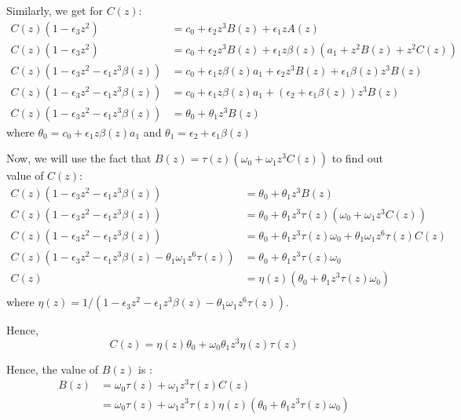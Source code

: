 \documentclass[11pt,a4paper]{article}
\begin{document}
Similarly, we get for $C(z)$:
\begin{align*}
C(z)(1 - \epsilon_3 z^2 ) & =  c_0 +   \epsilon_2 z^3 B(z) + \epsilon_1  z A(z)\\
C(z)(1 - \epsilon_3 z^2 )  &=  c_0 +   \epsilon_2 z^3 B(z) + \epsilon_1  z \beta(z) (a_1  +  z^2 B(z) + z^2 C(z))\\
C(z)(1 - \epsilon_3 z^2 - \epsilon_1  z^3   \beta(z))  &=  c_0 +  \epsilon_1  z \beta(z) a_1+  \epsilon_2 z^3 B(z) + \epsilon_1   \beta(z) z^3 B(z) \\
C(z)(1 - \epsilon_3 z^2 - \epsilon_1  z^3   \beta(z))  &=  c_0 +  \epsilon_1  z \beta(z) a_1+  (\epsilon_2 + \epsilon_1   \beta(z)) z^3 B(z)\\
C(z)(1 - \epsilon_3 z^2 - \epsilon_1  z^3   \beta(z))  &=  \theta_0+ \theta_1  z^3 B(z)
\end{align*}
where $\theta_0= c_0 +  \epsilon_1  z \beta(z) a_1$ and $\theta_1= \epsilon_2 + \epsilon_1   \beta(z)$

Now, we will use the fact that $B(z)  =  \tau(z) ( \omega_0+    \omega_1 z^3 C(z) )$ to find out value of $C(z)$:
\begin{align*}
C(z)(1 - \epsilon_3 z^2 - \epsilon_1  z^3   \beta(z))  &=  \theta_0+ \theta_1  z^3 B(z) \\
C(z)(1 - \epsilon_3 z^2 - \epsilon_1  z^3   \beta(z))  &=  \theta_0+ \theta_1  z^3 \tau(z) ( \omega_0+    \omega_1 z^3 C(z) ) \\
C(z)(1 - \epsilon_3 z^2 - \epsilon_1  z^3   \beta(z))  &=  \theta_0+ \theta_1  z^3 \tau(z)  \omega_0 + \theta_1   \omega_1  z^6 \tau(z)    C(z) \\
C(z)(1 - \epsilon_3 z^2 - \epsilon_1  z^3   \beta(z) -\theta_1   \omega_1  z^6 \tau(z)   )  &=  \theta_0+ \theta_1  z^3 \tau(z)  \omega_0  \\
C(z)  &=  \eta(z)( \theta_0+ \theta_1  z^3 \tau(z)  \omega_0 ) \\
\end{align*}
where $\eta(z)=1/(1 - \epsilon_3 z^2 - \epsilon_1  z^3   \beta(z) -\theta_1   \omega_1  z^6 \tau(z)   )$.

Hence, 
\begin{equation}
\boxed{C(z)  =  \eta(z) \theta_0+  \omega_0 \theta_1  z^3 \eta(z) \tau(z)   }
\end{equation}

Hence, the value of $B(z)$ is :
\begin{align*}
B(z)  &=    \omega_0 \tau(z) +    \omega_1 z^3  \tau(z) C(z) \\
&= \omega_0 \tau(z) +    \omega_1 z^3  \tau(z) \eta(z)( \theta_0+ \theta_1  z^3 \tau(z)  \omega_0 ) 
\end{align*}
\end{document}
